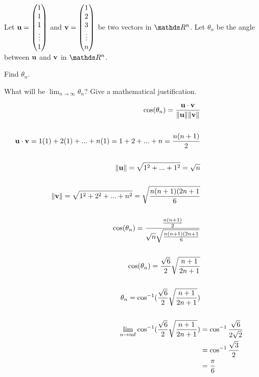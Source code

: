 \begin{problem}{\problemnum} 
Let $\mathbf{u}=\begin{pmatrix}
                 1 \\
                 1 \\
                 1  \\
                 \vdots \\
                 1
               \end{pmatrix}$ and $\mathbf{v}=\begin{pmatrix}
                 1 \\
                 2 \\
                 3  \\
                 \vdots \\
                 n
               \end{pmatrix}$
               be two vectors in $\bbR^n$. Let $\theta_n$ be the angle between $\mathbf{u}$ and $\mathbf{v}$ in $\bbR^n$.
               \begin{enumalph}
                \item Find $\theta_n$.
                \item What will be $\lim_{n \to \infty} \theta_n$? Give a mathematical justification.
               \end{enumalph}
\end{problem}
\begin{solution}

\begin{align*}
    \cos(\theta_{n}) = \frac{\mathbf{u} \cdot \mathbf{v}}{\lVert\mathbf{u}\rVert\lVert\mathbf{v}\rVert}
    \\\\
    \mathbf{u} \cdot \mathbf{v} = 1(1) + 2(1) + ... + n(1) 
                  = 1 + 2 + ... + n
                  = \frac{n(n+1)}{2}
   \\\\
   \lVert\mathbf{u}\rVert = \sqrt{1^2 + ... + 1^2} = \sqrt{n}
   \\\\
   \lVert\mathbf{v}\rVert = \sqrt{1^2 + 2^2 + ... + n^2}
   = \sqrt{\frac{n(n+1)(2n+1}{6}}
   \\\\
   \cos(\theta_{n}) = \frac{\frac{n(n+1)}{2}}{\sqrt{n}\sqrt{\frac{n(n+1)(2n+1}{6}}}
   \\\\
   \cos(\theta_{n}) = \frac{\sqrt{6}}{2}\sqrt{\frac{n+1}{2n+1}}
   \\\\
   \theta_{n} = \cos^{-1}(\frac{\sqrt{6}}{2}\sqrt{\frac{n+1}{2n+1}})
   \\\\
   \lim_{n\to\inf}\cos^{-1}( \frac{\sqrt{6}} {2} \sqrt{\frac{n+1} {2n+1}}) &= \cos^{-1}\frac{\sqrt{6}}{2\sqrt{2}}
   \\
   &= \cos^{-1}\frac{\sqrt{3}}{2} 
   \\
   &= \frac{\pi}{6}
\end{align*}

\end{solution}
